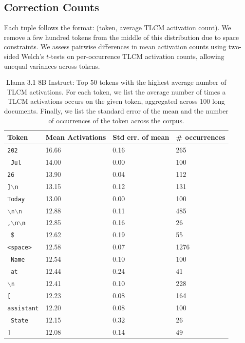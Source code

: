 \subsection{Correction Counts}

Each tuple follows the format: (token, average TLCM activation count). We remove a few hundred tokens from the middle of this distribution due to space constraints. We assess pairwise differences in mean activation counts using two-sided Welch's $t$-tests on per-occurrence TLCM activation counts, allowing unequal variances across tokens.


\begin{table}[h!]
\centering
\caption{Llama 3.1 8B Instruct: Top 50 tokens with the highest average number of TLCM activations. For each token, we list the average number of times a TLCM activations occurs on the given token, aggregated across 100 long documents. Finally, we list the standard error of the mean and the number of occurrences of the token across the corpus.}
\label{table:token_correction_counts_llama_top}
\begin{tabular}{llll}
\toprule
\textbf{Token} & \textbf{Mean Activations} & \textbf{Std err. of mean} & \textbf{\# occurrences} \\
\midrule
\texttt{202} & 16.66 & 0.16 & 265 \\
\texttt{ Jul} & 14.00 & 0.00 & 100 \\
\texttt{26} & 13.90 & 0.04 & 112 \\
\texttt{]$\backslash$n} & 13.15 & 0.12 & 131 \\
\texttt{Today} & 13.00 & 0.00 & 100 \\
\texttt{$\backslash$n$\backslash$n} & 12.88 & 0.11 & 485 \\
\texttt{,$\backslash$n$\backslash$n} & 12.85 & 0.16 & 26 \\
\texttt{ $\$$} & 12.62 & 0.19 & 55 \\
\texttt{<space>} & 12.58 & 0.07 & 1276 \\
\texttt{ Name} & 12.54 & 0.10 & 100 \\
\texttt{ at} & 12.44 & 0.24 & 41 \\
\texttt{$\backslash$n} & 12.41 & 0.10 & 228 \\
\texttt{[} & 12.23 & 0.08 & 164 \\
\texttt{assistant} & 12.20 & 0.08 & 100 \\
\texttt{ State} & 12.15 & 0.32 & 26 \\
\texttt{]} & 12.08 & 0.14 & 49 \\

\end{tabular}
\end{table}
